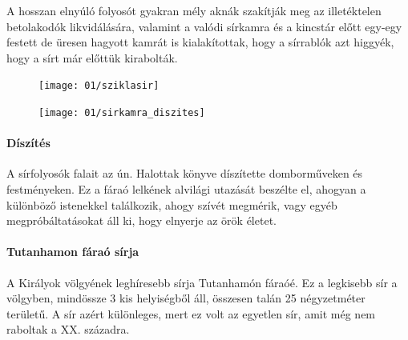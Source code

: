 A hosszan elnyúló folyosót gyakran mély aknák szakítják meg az illetéktelen betolakodók likvidálására, valamint a valódi sírkamra és a kincstár előtt egy-egy festett de üresen hagyott kamrát is kialakítottak, hogy a sírrablók azt higgyék, hogy a sírt már előttük kirabolták.

\begin{figure}
	\begin{minipage}{0.45\textwidth}
		\begin{tcolorbox}[enhanced,colframe=gray!50!white,
			colbacktitle=gray!15!white,
			coltitle=gray!50!black,
			borderline={0.5mm}{0mm}{gray!15!white},
			borderline={0.5mm}{0mm}{gray!50!white,dashed},
			attach boxed title to top center={yshift=-2mm},
			boxed title style={boxrule=0.4pt},
			title=Sziklasír belülről]{
				\texttt{[image: 01/sziklasir]}}
		\end{tcolorbox}
	\end{minipage}
	\begin{minipage}{0.45\textwidth}
		\begin{tcolorbox}[enhanced,colframe=gray!50!white,
			colbacktitle=gray!15!white,
			coltitle=gray!50!black,
			borderline={0.5mm}{0mm}{gray!15!white},
			borderline={0.5mm}{0mm}{gray!50!white,dashed},
			attach boxed title to top center={yshift=-2mm},
			boxed title style={boxrule=0.4pt},
			title=Tutanhamon sírkamrája]{
				\texttt{[image: 01/sirkamra\_diszites]}}
		\end{tcolorbox}
	\end{minipage}
\end{figure} 

\paragraph{Díszítés}
A sírfolyosók falait az ún. Halottak könyve díszítette domborműveken és festményeken. Ez a fáraó lelkének alvilági utazását beszélte el, ahogyan a különböző istenekkel találkozik, ahogy szívét megmérik, vagy egyéb megpróbáltatásokat áll ki, hogy elnyerje az örök életet.

\paragraph{Tutanhamon fáraó sírja}
A Királyok völgyének leghíresebb sírja Tutanhamón fáraóé. Ez a legkisebb sír a völgyben, mindössze 3 kis helyiségből áll, összesen talán 25 négyzetméter területű. A sír azért különleges, mert ez volt az egyetlen sír, amit még nem raboltak a XX. századra.

